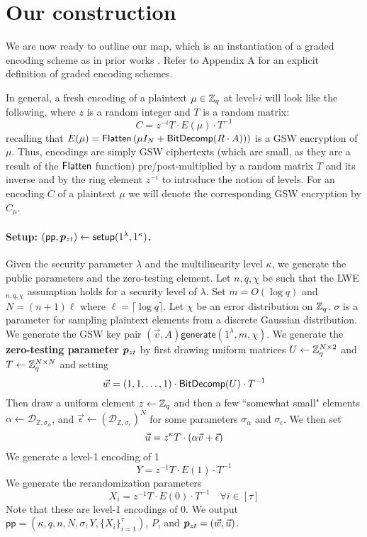 \section{Our construction}

We are now ready to outline our map, which is an instantiation of a graded encoding scheme as in prior works \cite{clt, ggh13a, clt15}.  Refer to Appendix A for an explicit definition of graded encoding schemes. 

In general, a fresh encoding of a plaintext $\mu \in \mathbb{Z}_q$ at level-$i$ will look like the following, where $z$ is a random integer and $T$ is a random matrix:
$$C = z^{-i}T \cdot E(\mu)\cdot T^{-1}$$
recalling that $E(\mu) = \mathsf{Flatten}\left(\mu I_{N} + \mathsf{BitDecomp}(R\cdot A))\right)$ is a GSW encryption of $\mu$. Thus, encodings are simply GSW ciphertexts (which are small, as they are a result of the $\mathsf{Flatten}$ function) pre/post-multiplied by a random matrix $T$ and its inverse and by the ring element $z^{-i}$ to introduce the notion of levels.  For an encoding $C$ of a plaintext $\mu$ we will denote the corresponding GSW encryption by $C_\mu$.

\paragraph{Setup: $(\mathsf{pp},\bm{p}_{zt}) \leftarrow \mathsf{setup}(1^\lambda, 1^\kappa)$.}  Given the security parameter $\lambda$ and the multilinearity level $\kappa$, we generate the public parameters and the zero-testing element.  Let $n,q, \chi$ be such that the LWE$_{n,q,\chi}$ assumption holds for a security level of $\lambda$.  Set $m = O(\log q)$ and $N = (n+1)\ell$ where $\ell = \lceil \log q \rceil$.  Let $\chi$ be an error distribution on $\mathbb{Z}_q$.  $\sigma$ is a parameter for sampling plaintext elements from a discrete Gaussian distribution.  We generate the GSW key pair $(\vec{v},A) \mathsf{generate}(1^\lambda,m, \chi)$.  We generate the {\bf zero-testing parameter} $\bm{p}_{zt}$ by first drawing uniform matrices $U \leftarrow \mathbb{Z}_q^{N\times 2}$ and $T \leftarrow \mathbb{Z}_q^{N \times N}$ and setting $$\vec{w} = (1,1,\ldots,1)\cdot \mathsf{BitDecomp}(U)\cdot T^{-1}$$  Then draw a uniform element $z \leftarrow \mathbb{Z}_q$ and then a few ``somewhat small" elements $\alpha \leftarrow \mathcal{D}_{\mathbb{Z}, \sigma_\alpha}$, and $\vec{\epsilon} \leftarrow (\mathcal{D}_{\mathbb{Z}, \sigma_\epsilon})^N$ for some parameters $\sigma_\alpha$ and $\sigma_\epsilon$.  We then set $$\vec{u} = z^\kappa T\cdot (\alpha\vec{v} + \vec{\epsilon})$$  We generate a level-1 encoding of 1 $$Y = z^{-1}T\cdot E(1) \cdot T^{-1}$$  We generate the rerandomization parameters $$X_i = z^{-1}T\cdot E(0) \cdot T^{-1} \quad \forall i \in [\tau]$$  Note that these are level-1 encodings of 0. We output $\mathsf{pp} = (\kappa, q,n,N,\sigma, Y, \{X_i\}_{i=1}^\tau)$, $P$, and $\bm{p}_{zt} = (\vec{w},\vec{u})$.

